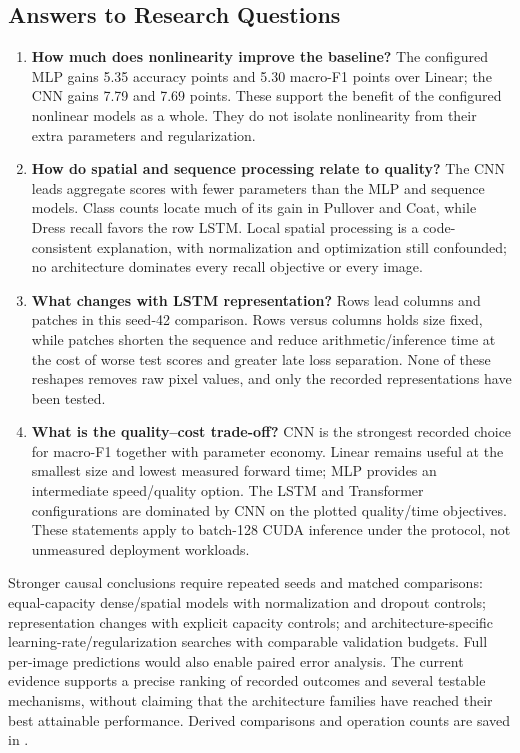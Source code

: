 \subsection{Answers to Research Questions}

\begin{enumerate}
    \relax
    \item \textbf{How much does nonlinearity improve the baseline?} The configured MLP gains 5.35 accuracy points and 5.30 macro-F1 points over Linear; the CNN gains 7.79 and 7.69 points. These support the benefit of the configured nonlinear models as a whole. They do not isolate nonlinearity from their extra parameters and regularization.
    \item \textbf{How do spatial and sequence processing relate to quality?} The CNN leads aggregate scores with fewer parameters than the MLP and sequence models. Class counts locate much of its gain in Pullover and Coat, while Dress recall favors the row LSTM. Local spatial processing is a code-consistent explanation, with normalization and optimization still confounded; no architecture dominates every recall objective or every image.
    \item \textbf{What changes with LSTM representation?} Rows lead columns and patches in this seed-42 comparison. Rows versus columns holds size fixed, while patches shorten the sequence and reduce arithmetic/inference time at the cost of worse test scores and greater late loss separation. None of these reshapes removes raw pixel values, and only the recorded representations have been tested.
    \item \textbf{What is the quality--cost trade-off?} CNN is the strongest recorded choice for macro-F1 together with parameter economy. Linear remains useful at the smallest size and lowest measured forward time; MLP provides an intermediate speed/quality option. The LSTM and Transformer configurations are dominated by CNN on the plotted quality/time objectives. These statements apply to batch-128 CUDA inference under the protocol, not unmeasured deployment workloads.
\end{enumerate}

Stronger causal conclusions require repeated seeds and matched comparisons: equal-capacity dense/spatial models with normalization and dropout controls; representation changes with explicit capacity controls; and architecture-specific learning-rate/regularization searches with comparable validation budgets. Full per-image predictions would also enable paired error analysis. The current evidence supports a precise ranking of recorded outcomes and several testable mechanisms, without claiming that the architecture families have reached their best attainable performance. Derived comparisons and operation counts are saved in .
